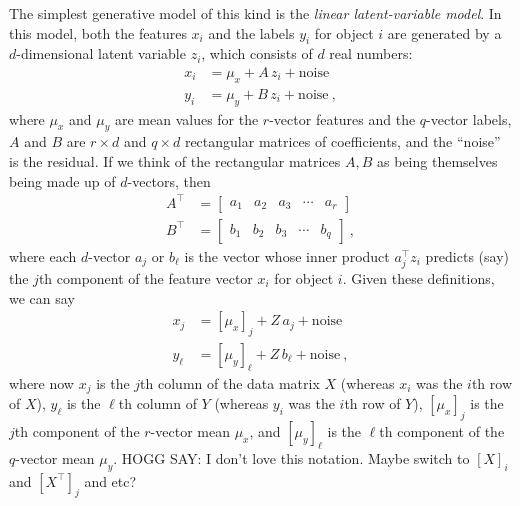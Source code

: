 \documentclass[modern]{aastex631}
\begin{document}
The simplest generative model of this kind is the \emph{linear latent-variable model}.
In this model, both the features $x_i$ and the labels $y_i$ for object $i$ are generated by a $d$-dimensional latent variable $z_i$, which consists of $d$ real numbers:
\begin{align}
  x_i &= \mu_x + A\,z_i + \mbox{noise} \\
  y_i &= \mu_y + B\,z_i + \mbox{noise} ~,
\end{align}
where $\mu_x$ and $\mu_y$ are mean values for the $r$-vector features and the $q$-vector labels,
$A$ and $B$ are $r\times d$ and $q\times d$ rectangular matrices of coefficients,
and the ``noise'' is the residual.
If we think of the rectangular matrices $A, B$ as being themselves being made up of $d$-vectors, then
\begin{align}
  A^\top &= \begin{bmatrix}a_1 & a_2 & a_3 & \cdots & a_r\end{bmatrix} \\
  B^\top &= \begin{bmatrix}b_1 & b_2 & b_3 & \cdots & b_q\end{bmatrix} ~,
\end{align}
where each $d$-vector $a_j$ or $b_\ell$ is the vector whose inner product $a_j^\top z_i$ predicts (say) the $j$th component of the feature vector $x_i$ for object $i$.
Given these definitions, we can say
\begin{align}
  x_j &= [\mu_x]_j + Z\,a_j + \mbox{noise} \\
  y_\ell &= [\mu_y]_\ell + Z\,b_\ell + \mbox{noise} ~,
\end{align}
where now $x_j$ is the $j$th column of the data matrix $X$ (whereas $x_i$ was the $i$th row of $X$),
$y_\ell$ is the $\ell$th column of $Y$ (whereas $y_i$ was the $i$th row of $Y$),
$[\mu_x]_j$ is the $j$th component of the $r$-vector mean $\mu_x$,
and $[\mu_y]_\ell$ is the $\ell$th component of the $q$-vector mean $\mu_y$.
HOGG SAY: I don't love this notation. Maybe switch to $[X]_i$ and $[X^\top]_j$ and etc?
\end{document}
